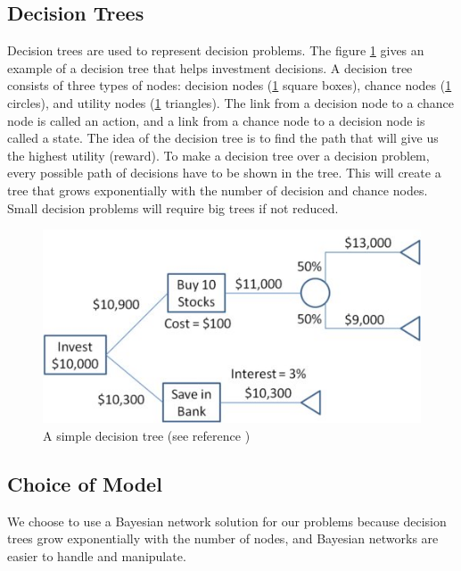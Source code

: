 \subsection{Decision Trees}
Decision trees are used to represent decision problems. The figure \ref{fig:basicdecisiontree} gives an example of a decision tree that helps investment decisions. A decision tree consists of three types of nodes: decision nodes (\ref{fig:basicdecisiontree} square boxes), chance nodes (\ref{fig:basicdecisiontree} circles), and utility nodes (\ref{fig:basicdecisiontree} triangles). The link from a decision node to a chance node is called an action, and a link from a chance node to a decision node is called a state. The idea of the decision tree is to find the path that will give us the highest utility (reward). To make a decision tree over a decision problem, every possible path of decisions have to be shown in the tree. This will create a tree that grows exponentially with the number of decision and chance nodes. Small decision problems will require big trees if not reduced. 
	
\begin{figure}[H]
\includegraphics[scale=.5]{Figures/BayesianPictures/SimpleDecisionTree.png}
\caption{A simple decision tree (see reference \cite{sdt})}
\label{fig:basicdecisiontree}
\end{figure}

\subsection{Choice of Model}
We choose to use a Bayesian network solution for our problems because decision trees grow exponentially with the number of nodes, and 
Bayesian networks are easier to handle and manipulate.
